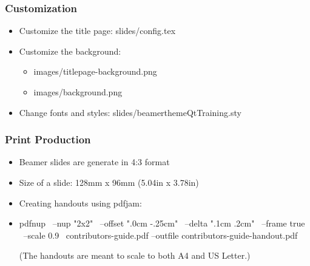 \begin{slide}
  \frametitle{Customization}
  \begin{itemize}
    \item Customize the title page: slides/config.tex
    \item Customize the background:
    \begin{itemize}
      \item images/titlepage-background.png
      \item images/background.png
    \end{itemize}
    \item Change fonts and styles: slides/beamerthemeQtTraining.sty
  \end{itemize}
\end{slide}

\begin{slide}[fragile]
  \frametitle{Print Production}
  \begin{itemize}
    \item Beamer slides are generate in 4:3 format
    \item Size of a slide: 128mm x 96mm (5.04in x 3.78in)
    \item Creating handouts using pdfjam:
    \item[] \begin{shell}
pdfnup \
  --nup "2x2" \
  --offset ".0cm -.25cm" \
  --delta ".1cm .2cm" \
  --frame true \
  --scale 0.9 \
  contributors-guide.pdf --outfile contributors-guide-handout.pdf
    \end{shell}
    {\footnotesize (The handouts are meant to scale to both A4 and US Letter.)}
  \end{itemize}
\end{slide}
